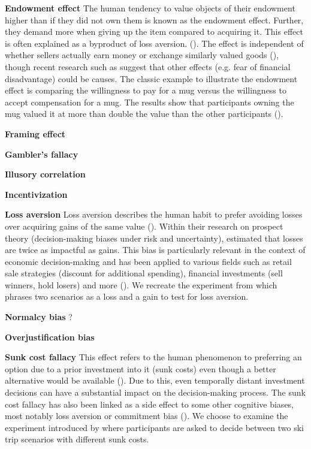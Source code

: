 \par \textbf{Endowment effect} The human tendency to value objects of their endowment higher than if they did not own them is known as the endowment effect. Further, they demand more when giving up the item compared to acquiring it. This effect is often explained as a byproduct of loss aversion. (\cite{kahneman1990experimental}). The effect is independent of whether sellers actually earn money or exchange similarly valued goods (\cite{knetsch1989endowment}), though recent research such as \cite{weaver2012reference} suggest that other effects (e.g. fear of financial disadvantage) could be causes. The classic example to illustrate the endowment effect is comparing the willingness to pay for a mug versus the willingness to accept compensation for a mug. The results show that participants owning the mug valued it at more than double the value than the other participants (\cite{kahneman1990experimental}).

\par \textbf{Framing effect} 

\par \textbf{Gambler's fallacy} 

\par \textbf{Illusory correlation} 

\par \textbf{Incentivization} 

\par \textbf{Loss aversion} Loss aversion describes the human habit to prefer avoiding losses over acquiring gains of the same value  (\cite{liu2023review}). Within their research on prospect theory (decision-making biases under risk and uncertainty), \cite{tversky1992advances} estimated that losses are twice as impactful as gains. This bias is particularly relevant in the context of economic decision-making and has been applied to various fields such as retail sale strategies (discount for additional spending), financial investments (sell winners, hold losers) and more (\cite{liu2023review}). We recreate the experiment from \cite{thaler2015misbehaving} which phrases two scenarios as a loss and a gain to test for loss aversion.

\par \textbf{Normalcy bias} ?

\par \textbf{Overjustification bias} 

\par \textbf{Sunk cost fallacy} This effect refers to the human phenomenon to preferring an option due to a prior investment into it (sunk costs) even though a better alternative would be available (\cite{arkes1985psychology}). Due to this, even temporally distant investment decisions can have a substantial impact on the decision-making process. The sunk cost fallacy has also been linked as a side effect to some other cognitive biases, most notably loss aversion or commitment bias (\cite{jarmolowicz2016sunk}). We choose to examine the experiment introduced by \cite{arkes1985psychology} where participants are asked to decide between two ski trip scenarios with different sunk costs.

